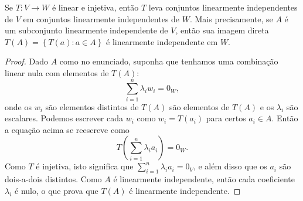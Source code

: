 \begin{theorem}
	Se $T\colon V\to W$ é linear e injetiva, então $T$ leva conjuntos linearmente independentes de $V$ em conjuntos linearmente independentes de $W$. Mais precisamente, se $A$ é um subconjunto linearmente independente de $V$, então sua imagem direta $T(A)=\left\{T(a):a\in A\right\}$ é linearmente independente em $W$.
\end{theorem}

\begin{proof}
	Dado $A$ como no enunciado, suponha que tenhamos uma combinação linear nula com elementos de $T(A)$:
	\[\sum_{i=1}^n\lambda_i w_i=0_W,\]
	onde os $w_i$ são elementos distintos de $T(A)$ são elementos de $T(A)$ e os $\lambda_i$ são escalares. Podemos escrever cada $w_i$ como $w_i=T(a_i)$ para certos $a_i\in A$. Então a equação acima se reescreve como
	\[T\left(\sum_{i=1}^n\lambda_i a_i\right)=0_W.\]
	Como $T$ é injetiva, isto significa que $\sum_{i=1}^n\lambda_i a_i=0_V$, e além disso que os $a_i$ são dois-a-dois distintos. Como $A$ é linearmente independente, então cada coeficiente $\lambda_i$ é nulo, o que prova que $T(A)$ é linearmente independente.
\end{proof}